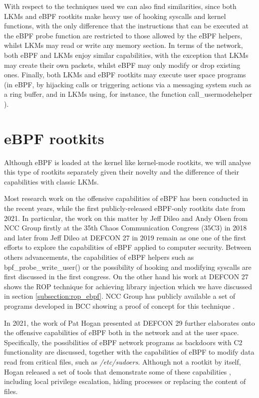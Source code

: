 With respect to the techniques used we can also find similarities, since both LKMs and eBPF rootkits make heavy use of hooking syscalls and kernel functions, with the only difference that the instructions that can be executed at the eBPF probe function are restricted to those allowed by the eBPF helpers, whilst LKMs may read or write any memory section. In terms of the network, both eBPF and LKMs enjoy similar capabilities, with the exception that LKMs may create their own packets, whilst eBPF may only modify or drop existing ones. Finally, both LKMs and eBPF rootkits may execute user space programs (in eBPF, by hijacking calls or triggering actions via a messaging system such as a ring buffer, and in LKMs using, for instance, the function call\_usermodehelper \cite{usermode_helper_lkm}).


\section{eBPF rootkits}
Although eBPF is loaded at the kernel like kernel-mode rootkits, we will analyse this type of rootkits separately given their novelty and the difference of their capabilities with classic LKMs.

Most research work on the offensive capabilities of eBPF has been conducted in the recent years, while the first publicly-released eBPF-only rootkits date from 2021. In particular, the work on this matter by Jeff Dileo and Andy Olsen from NCC Group firstly at the 35th Chaos Communication Congress (35C3) in 2018 \cite{god_ebpf} and later from Jeff Dileo at DEFCON 27 in 2019 \cite{evil_ebpf} remain as one one of the first efforts to explore the capabilities of eBPF applied to computer security. Between others advancements, the capabilities of eBPF helpers such as bpf\_probe\_write\_user() or the possibility of hooking and modifying syscalls are first discussed in the first congress. On the other hand his work at DEFCON 27 shows the ROP technique for achieving library injection which we have discussed in section \ref{subsection:rop_ebpf}. NCC Group has publicly available a set of programs developed in BCC showing a proof of concept for this technique \cite{evil_ebpf_github}.

In 2021, the work of Pat Hogan presented at DEFCON 29 \cite{bad_ebpf} further elaborates onto the offensive capabilities of eBPF both in the network and at the user space. Specifically, the possibilities of eBPF network programs as backdoors with C2 functionality are discussed, together with the capabilities of eBPF to modify data read from critical files, such as \textit{/etc/sudoers}. Although not a rootkit by itself, Hogan released a set of tools that demonstrate some of these capabilities \cite{bad_ebpf_github}, including local privilege escalation, hiding processes or replacing the content of files.

